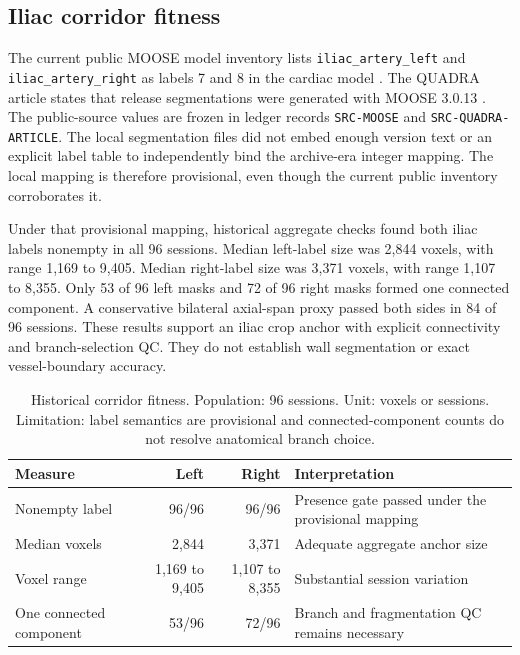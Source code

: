 \documentclass[11pt]{article}
\newcommand{\evidenceid}[1]{\texttt{#1}}
\begin{document}
\subsection{Iliac corridor fitness}

The current public MOOSE model inventory lists \texttt{iliac\_artery\_left} and \texttt{iliac\_artery\_right} as labels 7 and 8 in the cardiac model \citep{moose}. The QUADRA article states that release segmentations were generated with MOOSE 3.0.13 \citep{quadra2025}. The public-source values are frozen in ledger records \evidenceid{SRC-MOOSE} and \evidenceid{SRC-QUADRA-ARTICLE}. The local segmentation files did not embed enough version text or an explicit label table to independently bind the archive-era integer mapping. The local mapping is therefore provisional, even though the current public inventory corroborates it.

Under that provisional mapping, historical aggregate checks found both iliac labels nonempty in all 96 sessions. Median left-label size was 2,844 voxels, with range 1,169 to 9,405. Median right-label size was 3,371 voxels, with range 1,107 to 8,355. Only 53 of 96 left masks and 72 of 96 right masks formed one connected component. A conservative bilateral axial-span proxy passed both sides in 84 of 96 sessions. These results support an iliac crop anchor with explicit connectivity and branch-selection QC. They do not establish wall segmentation or exact vessel-boundary accuracy.

\begin{table}[H]
\centering
\caption{Historical corridor fitness. Population: 96 sessions. Unit: voxels or sessions. Limitation: label semantics are provisional and connected-component counts do not resolve anatomical branch choice.}
\label{tab:corridor}
\begin{tabularx}{\textwidth}{lrrX}
\toprule
Measure & Left & Right & Interpretation \\
\midrule
Nonempty label & 96/96 & 96/96 & Presence gate passed under the provisional mapping \\
Median voxels & 2,844 & 3,371 & Adequate aggregate anchor size \\
Voxel range & 1,169 to 9,405 & 1,107 to 8,355 & Substantial session variation \\
One connected component & 53/96 & 72/96 & Branch and fragmentation QC remains necessary \\
\bottomrule
\end{tabularx}
\end{table}
\end{document}
